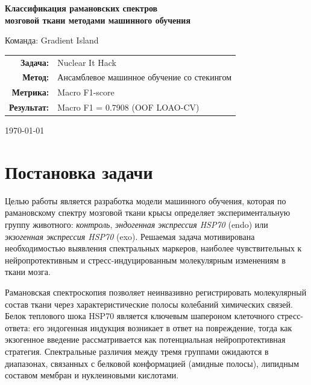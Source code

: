 \documentclass[12pt, a4paper]{article}
\begin{document}
\begin{titlepage}
  \centering
  \vspace*{2cm}

  {\Large\bfseries Классификация рамановских спектров\\
    мозговой ткани методами машинного обучения}\par
  \vspace{0.5cm}
  {\large Команда: Gradient Island}\par

  \vspace{3cm}

  \begin{tabular}{rl}
    \textbf{Задача:}       & Nuclear It Hack \\[4pt]
    \textbf{Метод:}        & Ансамблевое машинное обучение со стекингом \\[4pt]
    \textbf{Метрика:}      & Macro F1-score \\[4pt]
    \textbf{Результат:}    & Macro F1 = 0.7908 (OOF LOAO-CV) \\
  \end{tabular}

  \vfill
  {\small \today}
\end{titlepage}

\tableofcontents
\newpage

\section{Постановка задачи}

Целью работы является разработка модели машинного обучения, которая
по рамановскому спектру мозговой ткани крысы определяет
экспериментальную группу животного: \textit{контроль},
\textit{эндогенная экспрессия HSP70} (endo) или
\textit{экзогенная экспрессия HSP70} (exo).
Решаемая задача мотивирована необходимостью выявления спектральных
маркеров, наиболее чувствительных к нейропротективным
и стресс-индуцированным молекулярным изменениям в ткани мозга.

Рамановская спектроскопия позволяет неинвазивно регистрировать
молекулярный состав ткани через характеристические полосы
колебаний химических связей. Белок теплового шока HSP70 является
ключевым шапероном клеточного стресс-ответа: его эндогенная
индукция возникает в ответ на повреждение, тогда как экзогенное
введение рассматривается как потенциальная нейропротективная стратегия.
Спектральные различия между тремя группами ожидаются в диапазонах,
связанных с белковой конформацией (амидные полосы), липидным составом
мембран и нуклеиновыми кислотами.
\end{document}
